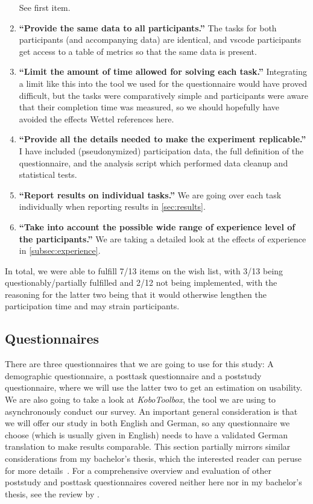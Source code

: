 \documentclass[../thesis]{subfiles}
\begin{document}
\begin{enumerate}
	      See first item. \cyes
	\item \textbf{\enquote{Provide the same data to all participants.}}
	      The tasks for both participants (and accompanying data) are identical, and \gls{vscode} participants get access to a table of metrics so that the same data is present. \cyes
	\item \textbf{\enquote{Limit the amount of time allowed for solving each task.}}
	      Integrating a limit like this into the tool we used for the questionnaire would have proved difficult, but the tasks were comparatively simple and participants were aware that their completion time was measured, so we should hopefully have avoided the effects Wettel references here. \chmm
	\item \textbf{\enquote{Provide all the details needed to make the experiment replicable.}}
	      I have included (pseudonymized) participation data, the full definition of the questionnaire, and the analysis script which performed data cleanup and statistical tests. \cyes
	\item \textbf{\enquote{Report results on individual tasks.}}
	      We are going over each task individually when reporting results in \cref{sec:results}. \cyes
	\item \textbf{\enquote{Take into account the possible wide range of experience level of the participants.}}
	      We are taking a detailed look at the effects of experience in \cref{subsec:experience}. \cyes
\end{enumerate}

In total, we were able to fulfill 7/13 items on the wish list, with 3/13 being questionably/partially fulfilled and 2/12 not being implemented, with the reasoning for the latter two being that it would otherwise lengthen the participation time and may strain participants.

\subsection{Questionnaires}\label{subsec:question}
There are three questionnaires that we are going to use for this study:
A demographic questionnaire, a \gls{posttask} questionnaire and a \gls{poststudy} questionnaire, where we will use the latter two to get an estimation on usability.
We are also going to take a look at \emph{KoboToolbox}, the tool we are using to asynchronously conduct our survey.
An important general consideration is that we will offer our study in both English and German, so any questionnaire we choose (which is usually given in English) needs to have a validated German translation to make results comparable.
This section partially mirrors similar considerations from my bachelor's thesis, which the interested reader can peruse for more details~\cite{galperin2021}.
For a comprehensive overview and evaluation of other \gls{poststudy} and \gls{posttask} questionnaires covered neither here nor in my bachelor's thesis, see the review by \textcite{hodrien2021}.
\end{document}
